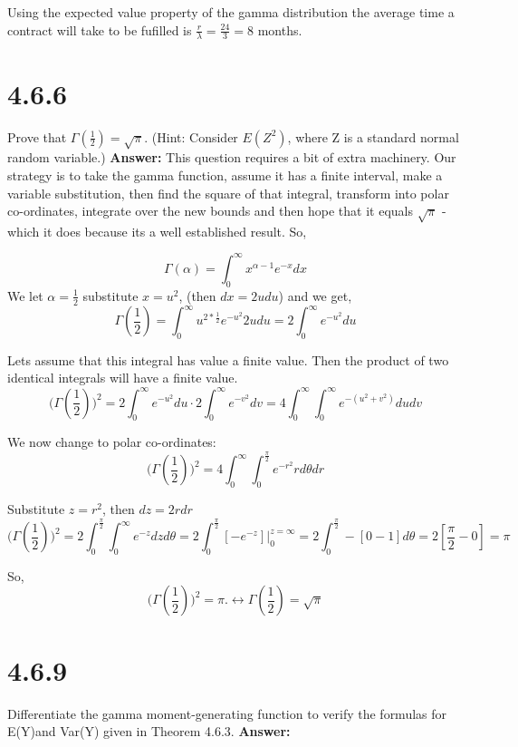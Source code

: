 \documentclass[svgnames]{article}
\begin{document}
Using the expected value property of the gamma distribution the average time a contract will take to be fufilled is $\frac{r}{\lambda}=\frac{24}{3}=8$ months.

\section{4.6.6}
Prove that $\Gamma(\frac{1}{2})=\sqrt{\pi}$. (Hint: Consider $E(Z^2)$, where Z is a standard normal random variable.)
\newline
\newline
\textbf{Answer:}
This question requires a bit of extra machinery. Our strategy is to take the gamma function, assume it has a finite interval, make a variable substitution, then find the square of that integral, transform into polar co-ordinates, integrate over the new bounds and then hope that it equals $\sqrt{\pi}$ - which it does because its a well established result.
\newline
So,

$$\Gamma(\alpha)=\int_{0}^{\infty}x^{\alpha-1}e^{-x}dx$$
We let $\alpha=\frac{1}{2}$ substitute $x=u^2$, (then $dx = 2udu$) and we get,
$$\Gamma(\frac{1}{2})=\int_{0}^{\infty}u^{2*\frac{1}{2}}e^{-u^2}2udu=2\int_{0}^{\infty}e^{-u^2}du$$

Lets assume that this integral has value a finite value. Then the product of two identical integrals will have a finite value.
$$\Big(\Gamma(\frac{1}{2})\Big)^2=2\int_{0}^{\infty}e^{-u^2}du \cdot 2\int_{0}^{\infty}e^{-v^2}dv = 4\int_{0}^{\infty}\int_{0}^{\infty}e^{-(u^2+v^2)}dudv $$

We now change to polar co-ordinates:
$$\Big(\Gamma(\frac{1}{2})\Big)^2 =4 \int_{0}^{\infty}\int_{0}^{\frac{\pi}{2}}e^{-r^2}rd\theta dr $$

Substitute $z=r^2$, then $dz = 2rdr$
$$\Big(\Gamma(\frac{1}{2})\Big)^2 = 2\int_{0}^{\frac{\pi}{2}}\int_{0}^{\infty}e^{-z}dzd\theta=2\int_{0}^{\frac{\pi}{2}}[-e^{-z}]\Big|^{z=\infty}_{0}=2\int_{0}^{\frac{\pi}{2}}-[0-1] d\theta=2[\frac{\pi}{2}-0]=\pi$$

So,
$$\Big(\Gamma(\frac{1}{2})\Big)^2 = \pi. \leftrightarrow \Gamma(\frac{1}{2})=\sqrt{\pi}$$


\section{4.6.9}
Differentiate the gamma moment-generating function to verify the formulas for E(Y)and Var(Y) given in Theorem 4.6.3.
\newline
\newline
\textbf{Answer:}
\end{document}
